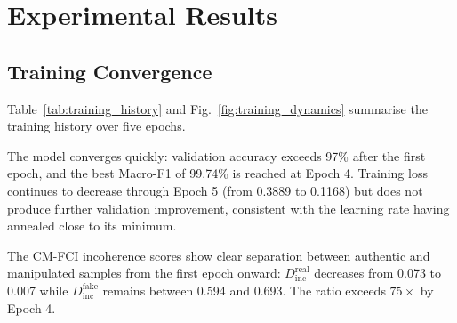 \documentclass[conference]{IEEEtran}
\begin{document}
\section{Experimental Results}
\label{sec:results}

\subsection{Training Convergence}

Table~\ref{tab:training_history} and Fig.~\ref{fig:training_dynamics} summarise the training history over five epochs.

\begin{table}[t]
\centering
\caption{Epoch-wise training history. Best validation Macro-F1 achieved at Epoch 4 (99.74\%). $D_{\mathrm{inc}}$ denotes the mean CM-FCI incoherence score.}
\label{tab:training_history}
\end{table}

The model converges quickly: validation accuracy exceeds 97\% after the first epoch, and the best Macro-F1 of 99.74\% is reached at Epoch 4. Training loss continues to decrease through Epoch 5 (from 0.3889 to 0.1168) but does not produce further validation improvement, consistent with the learning rate having annealed close to its minimum.

The CM-FCI incoherence scores show clear separation between authentic and manipulated samples from the first epoch onward: $D_{\mathrm{inc}}^{\mathrm{real}}$ decreases from 0.073 to 0.007 while $D_{\mathrm{inc}}^{\mathrm{fake}}$ remains between 0.594 and 0.693. The ratio exceeds $75\times$ by Epoch 4.
\end{document}
